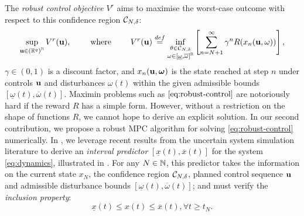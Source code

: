 \documentclass{article}
\begin{document}
The \emph{robust control objective} $V^r$ \citep{Bental2009,Bertsimas2011,Gorissen2015} aims to maximise the worst-case outcome with respect to this confidence region $\mathcal{C}_{N,\delta}$:
\begin{equation}
\label{eq:robust-control}
\sup_{\mathbf{u}\in{(\mathbb{R}^q)}^{\mathbb{N}}} {V^r(\mathbf{u})}, \qquad \text{ where }\qquad {V^r(\mathbf{u})} \stackrel{def}{=} \inf_{\substack{\theta \in \mathcal{C}_{N,\delta} \\ \omega\in[\underline{\omega},\overline{\omega}]^{\mathbb{R}}}} \left[\sum_{n=N+1}^\infty \gamma^n R(x_n(\mathbf{u},\omega))\right],
\end{equation}
$\gamma\in(0,1)$ is a discount factor, and $x_n(\mathbf{u},\bm{\omega})$ is the state reached at step $n$ under controls $\mathbf{u}$ and disturbances $\omega(t)$ within the given admissible bounds $[\underline\omega(t),\overline\omega(t)]$. Maximin problems such as $\eqref{eq:robust-control}$ are notoriously hard if the reward $R$ has a simple form. However, without a restriction on the shape of functions $R$, we cannot hope to derive an explicit solution.
In our second contribution, we propose a robust MPC algorithm for solving \eqref{eq:robust-control} numerically. In , we leverage recent results from the uncertain system simulation literature to derive an \emph{interval predictor} $[\underline{x}(t),\overline{x}(t)]$ for the system \eqref{eq:dynamics}, illustrated in . For any $N\in\mathbb{N}$, this predictor takes the information on the current state ${x}_N$, the confidence region $\mathcal{C}_{N,\delta}$, planned control sequence $\mathbf{u}$ and admissible disturbance bounds $[\underline{\omega}(t),\overline{\omega}(t)]$; and must verify the \emph{inclusion property}:
\begin{equation}
\label{eq:inclusion-property}
\underline{x}(t)\leq x(t)\leq\overline{x}(t), \forall t\geq t_N.
\end{equation}
\end{document}
